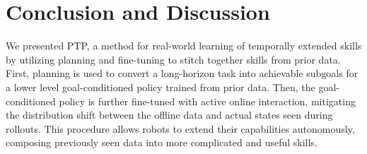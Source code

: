 \section{Conclusion and Discussion}

We presented PTP, a method for real-world learning of temporally extended skills by utilizing planning and fine-tuning to stitch together skills from prior data.
First, planning is used to convert a long-horizon task into achievable subgoals for a lower level goal-conditioned policy trained from prior data.
Then, the goal-conditioned policy is further fine-tuned with active online interaction, mitigating the distribution shift between the offline data and actual states seen during rollouts.
This procedure allows robots to extend their capabilities autonomously, composing previously seen data into more complicated and useful skills.